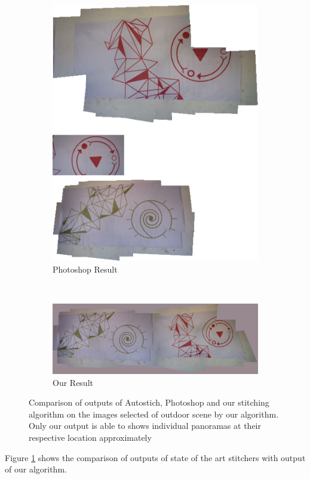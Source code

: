 \begin{figure}
\begin{subfigure}[b]{0.45\textwidth}
\includegraphics[width=\linewidth]{figures/green_red/photoshop_output.jpg}
\caption{Photoshop Result}
\end{subfigure}\\
\begin{subfigure}[b]{\textwidth}
\includegraphics[width=\linewidth]{figures/green_red/our_result.jpg}
\caption{Our Result}
\end{subfigure}
\caption{Comparison of outputs of Autostich, Photoshop and our stitching
algorithm on the images selected of outdoor scene by our algorithm. Only our
output is able to shows individual panoramas at their respective location
approximately}
\label{fig:green_red_comparison}
\end{figure}

Figure \ref{fig:green_red_comparison} shows the comparison of outputs of
state of the art stitchers with output of our algorithm.